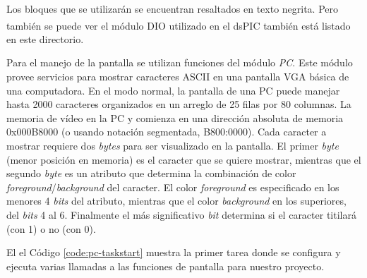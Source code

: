 \documentclass[11pt,a4paper,oneside]{article}
\begin{document}

Los bloques que se utilizarán se encuentran resaltados en texto negrita. Pero también se puede ver el módulo DIO utilizado en el dsPIC\textsuperscript{\textregistered} también está listado en este directorio. 

Para el manejo de la pantalla se utilizan funciones del módulo \emph{PC}. Este módulo provee servicios para mostrar caracteres ASCII en una pantalla VGA básica de una computadora. En el modo normal, la pantalla de una PC puede manejar hasta 2000 caracteres organizados en un arreglo de 25 filas por 80 columnas. La memoria de vídeo en la PC y comienza en una dirección absoluta de memoria 0x000B8000 (o usando notación segmentada, B800:0000). Cada caracter  a mostrar requiere dos \textsl{bytes} para ser visualizado en la pantalla. El primer \textsl{byte} (menor posición en memoria) es el caracter que se quiere mostrar, mientras que el segundo \textsl{byte} es un atributo que determina la combinación de color \textsl{foreground}/\textsl{background} del caracter. El color \textsl{foreground} es especificado en los menores 4 \textsl{bits} del atributo, mientras que el color \textsl{background} en los superiores, del \textsl{bits} 4 al 6. Finalmente el más significativo \textsl{bit} determina si el caracter titilará (con 1)  o no (con 0).

El el Código \ref{code:pc-taskstart} muestra la primer tarea donde se configura y ejecuta varias llamadas a las funciones de pantalla para nuestro proyecto. 
\end{document}
